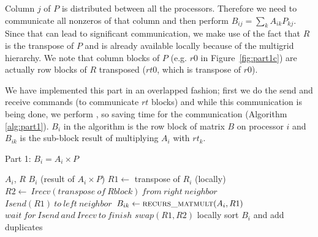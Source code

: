 Column $j$ of $P$ is distributed between all the processors. Therefore we need to communicate all nonzeros of that column and then perform $B_{ij} = \sum_{k} A_{ik} P_{kj}$. Since that can lead to significant communication, we make use of the fact that $R$ is the transpose of $P$ and is already available locally because of the multigrid hierarchy. We note that column blocks of $P$ (e.g. $r0$ in Figure~\ref{fig:part1c}) are actually row blocks of $R$ transposed ($rt0$, which is transpose of $r0$).

We have implemented this part in an overlapped fashion; first we do the send and receive commands (to communicate $rt$ blocks) and while this communication is being done, we perform \mm, so saving time for the communication (Algorithm \ref{alg:part1}). $B_{i}$ in the algorithm is the row block of matrix $B$ on processor $i$ and $B_{ik}$ is the sub-block result of multiplying $A_i$ with $rt_k$.

\begin{algorithm}[H] 
  \caption{Part 1: $B_i = A_i \times P$} \label{alg:part1} 
  \begin{algorithmic}[1]
    \Require $A_i$, $R$
    \Ensure  $B_i$ (result of $A_i \times P$)
    \State $R1 \leftarrow$ transpose of $R_i$ (locally)
      \State $R2 \leftarrow\ Irecv(transpose\ of\ R block)\ from\ right\ neighbor$
      \State $Isend(R1)\ to\ left\ neighbor$
      \State $B_{ik} \leftarrow \textsc{recurs\_matmult}(A_i, R1)$ 
      \State $wait\ for\ Isend\ and\ Irecv\ to\ finish$
      \State $swap(R1,R2)$
    \EndFor
    \State locally sort $B_i$ and add duplicates
  \end{algorithmic}
\end{algorithm}
